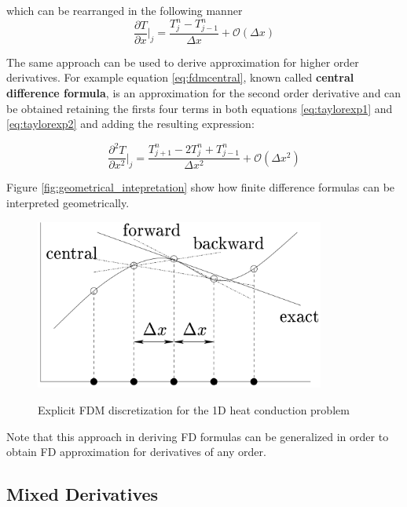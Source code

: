     which can be rearranged in the following manner
        \begin{equation}
    \frac{\partial T}{\partial x}\bigg\rvert_j  = \frac{T^n_{j} - T^n_{j-1}}{\Delta x} + \mathcal{O}(\Delta x)
    \label{eq:fdmfbackward}
    \end{equation}
    
   The same approach can be used to derive approximation for higher order derivatives.
   For example equation \ref{eq:fdmcentral}, known called \textbf{central difference formula}, is an approximation for the second order derivative and can be obtained retaining the firsts four terms in both equations \ref{eq:taylorexp1} and \ref{eq:taylorexp2} and adding the resulting expression:
   
    \begin{equation}
		\frac{\partial^2 T}{\partial x^2}\bigg\rvert_j = \frac{T^n_{j+1}- 2T^n_{j} + T^n_{j-1}}{\Delta x^2} + \mathcal{O}(\Delta x^2)
		\label{eq:fdmcentral}
    \end{equation}
    
    Figure \ref{fig:geometrical_intepretation} show how finite difference formulas can be interpreted geometrically.
\begin{figure}
	\centering
	\includegraphics[width=0.85\textwidth]{./images/CA_FDM/geometrical_interpretation_fd}
	\label{fig:geometrical_intepretation}
	\caption{Explicit FDM discretization for the 1D heat conduction problem}\label{torus}
\end{figure} 
    
Note that this approach in deriving FD formulas can be generalized in order to obtain FD approximation for derivatives of any order.

 \subsection{Mixed Derivatives}

